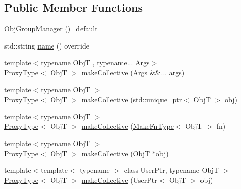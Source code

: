 \subsection*{Public Member Functions}
\begin{DoxyCompactItemize}
\item 
\hyperlink{structvt_1_1objgroup_1_1_obj_group_manager_a2de45aef25bff09a2fafabe227aa0ee7}{Obj\+Group\+Manager} ()=default
\item 
std\+::string \hyperlink{structvt_1_1objgroup_1_1_obj_group_manager_a92c0b07c2d90063c40087f625880cca3}{name} () override
\item 
{\footnotesize template$<$typename ObjT , typename... Args$>$ }\\\hyperlink{structvt_1_1objgroup_1_1_obj_group_manager_aea65eef52f240a52210132eef5ce591f}{Proxy\+Type}$<$ ObjT $>$ \hyperlink{structvt_1_1objgroup_1_1_obj_group_manager_a651c44a47c6bcdc9f1b6c9e857fa03f2}{make\+Collective} (Args \&\&... args)
\item 
{\footnotesize template$<$typename ObjT $>$ }\\\hyperlink{structvt_1_1objgroup_1_1_obj_group_manager_aea65eef52f240a52210132eef5ce591f}{Proxy\+Type}$<$ ObjT $>$ \hyperlink{structvt_1_1objgroup_1_1_obj_group_manager_ac1c2489611d2064b89b65b90059b2c4b}{make\+Collective} (std\+::unique\+\_\+ptr$<$ ObjT $>$ obj)
\item 
{\footnotesize template$<$typename ObjT $>$ }\\\hyperlink{structvt_1_1objgroup_1_1_obj_group_manager_aea65eef52f240a52210132eef5ce591f}{Proxy\+Type}$<$ ObjT $>$ \hyperlink{structvt_1_1objgroup_1_1_obj_group_manager_a34d75d825c84636cd9c13f6185243414}{make\+Collective} (\hyperlink{structvt_1_1objgroup_1_1_obj_group_manager_a397d787b3876752a6d70511b2769b872}{Make\+Fn\+Type}$<$ ObjT $>$ fn)
\item 
{\footnotesize template$<$typename ObjT $>$ }\\\hyperlink{structvt_1_1objgroup_1_1_obj_group_manager_aea65eef52f240a52210132eef5ce591f}{Proxy\+Type}$<$ ObjT $>$ \hyperlink{structvt_1_1objgroup_1_1_obj_group_manager_a08fdc6029708edf1e3f7a4a66c998b99}{make\+Collective} (ObjT $\ast$obj)
\item 
{\footnotesize template$<$template$<$ typename $>$ class User\+Ptr, typename ObjT $>$ }\\\hyperlink{structvt_1_1objgroup_1_1_obj_group_manager_aea65eef52f240a52210132eef5ce591f}{Proxy\+Type}$<$ ObjT $>$ \hyperlink{structvt_1_1objgroup_1_1_obj_group_manager_affb52495aa20a14b485ad3ba48234718}{make\+Collective} (User\+Ptr$<$ ObjT $>$ obj)

\end{DoxyCompactItemize}
